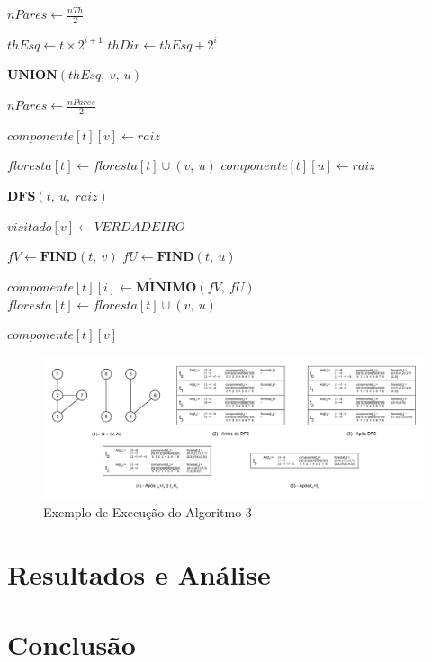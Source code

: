 \documentclass[12pt]{article}
\begin{document}
\begin{algorithm}[H]
{        %
        $nPares \gets \frac{nTh}{2}$\;
        {
            {
                $thEsq \gets t \times 2^{i+1}$\;
                $thDir \gets thEsq + 2^i$\;
                
                {
                    $\textbf{UNION}(thEsq,\ v,\ u)$\;
                }
            }
            $nPares \gets \frac{nPares}{2}$\;
        }
    }
    {
        $componente[t][v] \gets raiz$\;
        
        {
            $floresta[t] \gets floresta[t] \cup (v,\ u)$\;
            $componente[t][u] \gets raiz$\;
            
            {
                {
                    $\textbf{DFS}(t,\ u,\ raiz)$\;
                }
            }
        }
        $visitado[v] \gets VERDADEIRO$\;
    }
    {
        $fV \gets  \textbf{FIND}(t,\ v)$\;
        $fU \gets  \textbf{FIND}(t,\ u)$\;
        
        {
            {
                {
                    $componente[t][i] \gets \textbf{M} \acute{\textbf{I}} \textbf{NIMO}(fV,\ fU)$\;
                }
            }
            $floresta[t] \gets floresta[t] \cup (v,\ u)$\;
        }
    }
    {
        \Return $componente[t][v]$\;
    }
\end{algorithm}

\begin{figure}
\centering
\includegraphics[width=1\textwidth]{tabela_exe_par.pdf}
\caption{Exemplo de Execução do Algoritmo 3}
\label{fig:alg3}
\end{figure}

\section{Resultados e Análise}

{\color{gray}\lipsum[1]}

\section{Conclusão}

{\color{gray}\lipsum[1]}



\end{document}
